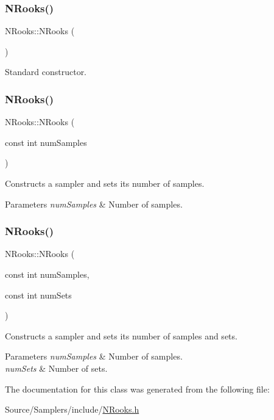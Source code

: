 \subsubsection{\texorpdfstring{N\+Rooks()}{NRooks()}\hspace{0.1cm}{\footnotesize\ttfamily [1/3]}}
{\footnotesize\ttfamily N\+Rooks\+::\+N\+Rooks (\begin{DoxyParamCaption}{ }\end{DoxyParamCaption})}

Standard constructor. \hypertarget{class_n_rooks_a927f85bd26be336f880f9b4e033d1cea}{}\label{class_n_rooks_a927f85bd26be336f880f9b4e033d1cea} 
\subsubsection{\texorpdfstring{N\+Rooks()}{NRooks()}\hspace{0.1cm}{\footnotesize\ttfamily [2/3]}}
{\footnotesize\ttfamily N\+Rooks\+::\+N\+Rooks (\begin{DoxyParamCaption}\item[{const int}]{num\+Samples }\end{DoxyParamCaption})}

Constructs a sampler and sets its number of samples. 
\begin{DoxyParams}{Parameters}
{\em num\+Samples} & Number of samples. \\
\hline
\end{DoxyParams}
\hypertarget{class_n_rooks_a79ca631d81a4b42d319cd2582bb39d8c}{}\label{class_n_rooks_a79ca631d81a4b42d319cd2582bb39d8c} 
\subsubsection{\texorpdfstring{N\+Rooks()}{NRooks()}\hspace{0.1cm}{\footnotesize\ttfamily [3/3]}}
{\footnotesize\ttfamily N\+Rooks\+::\+N\+Rooks (\begin{DoxyParamCaption}\item[{const int}]{num\+Samples,  }\item[{const int}]{num\+Sets }\end{DoxyParamCaption})}

Constructs a sampler and sets its number of samples and sets. 
\begin{DoxyParams}{Parameters}
{\em num\+Samples} & Number of samples. \\
\hline
{\em num\+Sets} & Number of sets. \\
\hline
\end{DoxyParams}


The documentation for this class was generated from the following file\+:\begin{DoxyCompactItemize}
\item 
Source/\+Samplers/include/\hyperlink{_n_rooks_8h}{N\+Rooks.\+h}\end{DoxyCompactItemize}
